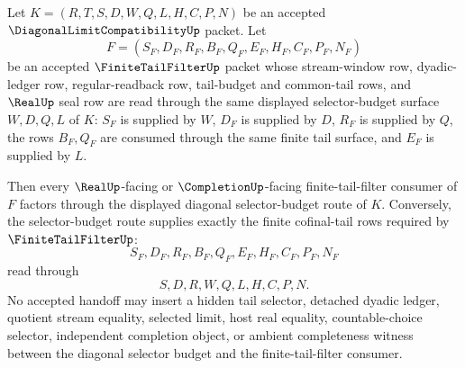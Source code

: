 \begin{theorem}
\label{thm:diagonal-limit-selector-budget-finite-tail-filter-handoff}
Let $K=(R,T,S,D,W,Q,L,H,C,P,N)$ be an accepted $\DiagonalLimitCompatibilityUp$ packet. Let
$$
F=(S_F,D_F,R_F,B_F,Q_F,E_F,H_F,C_F,P_F,N_F)
$$
be an accepted $\FiniteTailFilterUp$ packet whose stream-window row, dyadic-ledger row, regular-readback row, tail-budget and common-tail rows, and $\RealUp$ seal row are read through the same displayed selector-budget surface $W,D,Q,L$ of $K$: $S_F$ is supplied by $W$, $D_F$ is supplied by $D$, $R_F$ is supplied by $Q$, the rows $B_F,Q_F$ are consumed through the same finite tail surface, and $E_F$ is supplied by $L$.

Then every $\RealUp$-facing or $\CompletionUp$-facing finite-tail-filter consumer of $F$ factors through the displayed diagonal selector-budget route of $K$. Conversely, the selector-budget route supplies exactly the finite cofinal-tail rows required by $\FiniteTailFilterUp$:
$$
S_F,D_F,R_F,B_F,Q_F,E_F,H_F,C_F,P_F,N_F
$$
read through
$$
S,D,R,W,Q,L,H,C,P,N .
$$
No accepted handoff may insert a hidden tail selector, detached dyadic ledger, quotient stream equality, selected limit, host real equality, countable-choice selector, independent completion object, or ambient completeness witness between the diagonal selector budget and the finite-tail-filter consumer.
\end{theorem}
